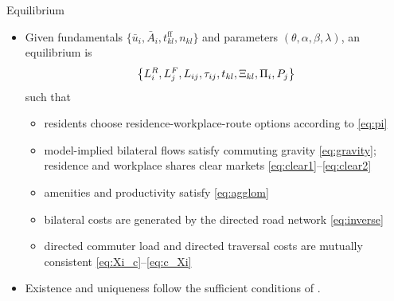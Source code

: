 \documentclass[11pt,aspectratio=169]{beamer}
\newcommand{\app}[1]{\allowbreak\hspace{0.25em}\hyperlink{#1}{\beamergotobutton{details}}}
\begin{document}
\begin{frame}{Equilibrium}
\begin{itemize}
  \item Given fundamentals $\{\bar u_i,\bar A_i,t^{\text{ff}}_{kl},n_{kl}\}$ and parameters $(\theta,\alpha,\beta,\lambda)$, an equilibrium is
  \vspace{-0.5em}\begin{equation}
    \left\{L_i^R,L_j^F,L_{ij},\tau_{ij},t_{kl},\Xi_{kl},\Pi_i,P_j\right\}
  \vspace{-0.5em}\end{equation}
  such that
  \begin{itemize}
    \item residents choose residence-workplace-route options according to \eqref{eq:pi}
    \item model-implied bilateral flows satisfy commuting gravity \eqref{eq:gravity}; residence and workplace shares clear markets \eqref{eq:clear1}--\eqref{eq:clear2}
    \item amenities and productivity satisfy \eqref{eq:agglom}
    \item bilateral costs are generated by the directed road network \eqref{eq:inverse}
    \item directed commuter load and directed traversal costs are mutually consistent \eqref{eq:Xi_c}--\eqref{eq:c_Xi}
  \end{itemize}
  \item Existence and uniqueness follow the sufficient conditions of \citet[Proposition~1]{allenarkolakis2022}. \app{appexist}
\end{itemize}
\end{frame}

\end{document}
